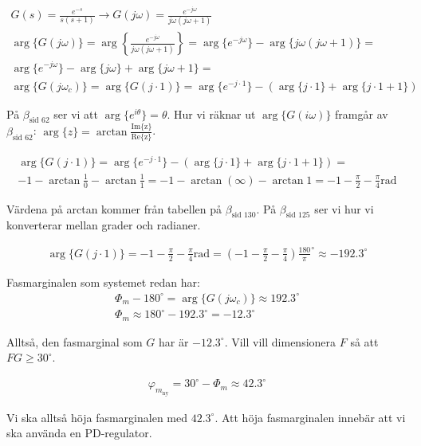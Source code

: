 \documentclass[a4paper]{article}
\newcommand{\mhb}[1]{$\beta_{\text{#1}}$}     %
\begin{document}
\begin{align*}
  G(s) = \frac{e^{-s}}{s(s+1)} \rightarrow G(j\omega) = \frac{e^{-j\omega}}{j\omega(j\omega + 1)}\\
  \arg\{G(j\omega)\}  = \arg \left\{\frac{e^{-j\omega}}{j\omega(j\omega + 1)} \right \} = \arg\{e^{-j\omega}\} - \arg\{j\omega(j\omega + 1)\} =\\
  \arg\{e^{-j\omega}\} - \arg\{j\omega\} + \arg\{j\omega + 1\} = \\
  \arg\{G(j\omega_c)\} = \arg\{G(j\cdot 1)\} = \arg\{e^{-j\cdot 1}\} - (\arg\{j\cdot 1\} + \arg\{j\cdot 1 + 1\})
\end{align*}

På \mhb{sid 62} ser vi att $\arg\{e^{i\theta}\} = \theta$. Hur vi räknar ut $\arg\{ G(i\omega) \}$ framgår av \mhb{sid 62}: $\arg\{z\} = \arctan{\frac{\text{Im\{z\}}}{\text{Re\{z\}}}}$.

\begin{align*}
  \arg\{G(j\cdot 1)\} = \arg\{e^{-j\cdot 1}\} - (\arg\{j\cdot 1\} + \arg\{j\cdot 1 + 1\}) = \\
  -1 - \arctan\frac{1}{0} - \arctan\frac{1}{1} = -1 -\arctan ( \infty ) - \arctan 1 = -1 -\frac{\pi}{2} -\frac{\pi}{4} \text{rad}
\end{align*}

Värdena på arctan kommer från tabellen på \mhb{sid 130}. På \mhb{sid 125} ser vi hur vi konverterar mellan grader och radianer.

\begin{align*}
  \arg\{G(j\cdot 1)\} = -1 -\frac{\pi}{2} -\frac{\pi}{4} \text{rad} = (-1 -\frac{\pi}{2} -\frac{\pi}{4})\frac{180}{\pi}^\circ \approx -192.3^\circ
\end{align*}

Fasmarginalen som systemet redan har:
\begin{align*}
  \Phi_m - 180^\circ = \arg\{G(j\omega_c)\} \approx 192.3^\circ\\
  \Phi_m \approx 180^\circ - 192.3^\circ = -12.3^\circ
\end{align*}

Alltså, den fasmarginal som $G$ har är $-12.3^\circ$. Vill vill dimensionera $F$ så att $FG \geq 30^\circ$.

\begin{align*}
  \varphi_{m_{\text{ny}}} = 30^\circ - \Phi_m \approx 42.3^\circ
\end{align*}

Vi ska alltså höja fasmarginalen med $42.3^\circ$. Att höja fasmarginalen innebär att vi ska använda en PD-regulator.
\end{document}
